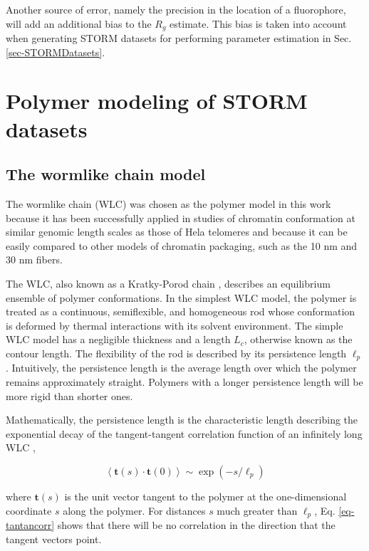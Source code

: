 \documentclass[12pt, a4paper]{article}
\begin{document}
Another source of error, namely the precision in the location of a
fluorophore, will add an additional bias to the $R_g$
estimate. This bias is taken into account when generating STORM
datasets for performing parameter estimation in
Sec. \ref{sec-STORMDatasets}.

\section{Polymer modeling of STORM datasets}
\label{sec-2}

\subsection{The wormlike chain model}
\label{sec-2-1}
The wormlike chain (WLC) was chosen as the polymer model in this
work because it has been successfully applied in studies of
chromatin conformation at similar genomic length scales as those of
Hela telomeres \cite{bystricky-pnas-2004, huet-2014} and because it
can be easily compared to other models of chromatin packaging, such
as the 10 nm and 30 nm fibers.

The WLC, also known as a Kratky-Porod chain
\cite{kratkyporod-1949}, describes an equilibrium ensemble of
polymer conformations.  In the simplest WLC model, the polymer is
treated as a continuous, semiflexible, and homogeneous rod whose
conformation is deformed by thermal interactions with its solvent
environment. The simple WLC model has a negligible thickness and a
length $L_c$, otherwise known as the contour length. The
flexibility of the rod is described by its persistence length
$\ell_p$. Intuitively, the persistence length is the average length
over which the polymer remains approximately straight. Polymers
with a longer persistence length will be more rigid than shorter
ones.

Mathematically, the persistence length is the characteristic length
describing the exponential decay of the tangent-tangent correlation
function of an infinitely long WLC
\cite{phillips-pbotc-2009, schellman-biopolymers-1974},

\begin{equation}
  \label{eq-tantancorr}
  \left< \mathbf{t} \left( s \right) \cdot \mathbf{t} \left( 0 \right) \right> \sim \exp \left( -s / \ell_p \right)
\end{equation}

where $\mathbf{t} \left( s \right)$ is the unit vector tangent to
the polymer at the one-dimensional coordinate $s$ along the
polymer. For distances $s$ much greater than $\ell_p$, Eq.
\eqref{eq-tantancorr} shows that there will be no correlation in
the direction that the tangent vectors point.
\end{document}
